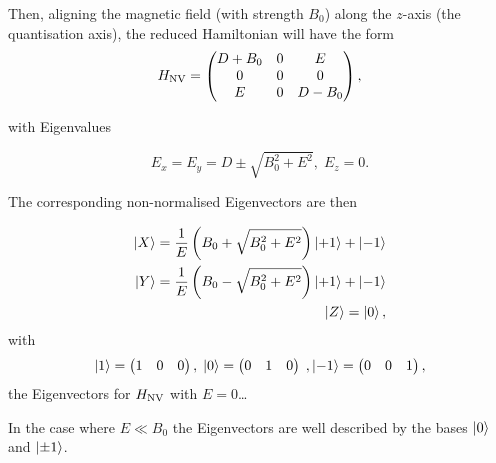 Then, aligning the magnetic field (with strength $B_0$) along the $z$-axis (the quantisation axis), the reduced Hamiltonian will have the form 
\begin{equation}
    H_{\ce{NV}} = \begin{pmatrix}
        D + B_0 & 0 & E \\ 
        0 & 0 & 0 \\ 
        E & 0 & D-B_0
    \end{pmatrix},
    \label{eq:reduced_H_NV_matrix}
\end{equation}

with Eigenvalues 

\begin{equation}
    E_x = E_y = D \pm \sqrt{B_0^2  + E^2}, \; E_z = 0.
    \label{eq:reduced_H_NV_eigenvalues}
\end{equation}

The corresponding non-normalised Eigenvectors are then 

\begin{eqnarray}
    \ket{X} = \frac{1}{E} \left(B_0 + \sqrt{B_0^2 + E^2}\right) \ket{+1} + \ket{-1} \\ 
    \ket{Y} = \frac{1}{E} \left(B_0 - \sqrt{B_0^2 + E^2}\right) \ket{+1} + \ket{-1} \\ 
    \ket{Z} = \ket{0},
\end{eqnarray}
with
\begin{equation}
    \ket{1} = \begin{pmatrix}
        1 & 0 & 0 
    \end{pmatrix}, \; 
    \ket{0} = \begin{pmatrix}
        0 & 1 & 0 
    \end{pmatrix}\;, 
    \ket{-1} = \begin{pmatrix}
        0 & 0 & 1 
    \end{pmatrix},
    \label{eq:base_states}
\end{equation}
the Eigenvectors for $H_{\ce{NV}}$ with $E=0$\dots

In the case where $E \ll B_0$ the Eigenvectors are well described by the bases $\ket{0}$ and $\ket{\pm 1}$.

